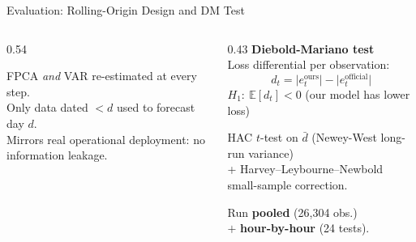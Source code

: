 \documentclass[10pt,aspectratio=169]{beamer}
\begin{document}
\begin{frame}{Evaluation: Rolling-Origin Design and DM Test}
  \begin{columns}
    \begin{column}{0.54\textwidth}
      \begin{center}
      \end{center}
      \small FPCA \emph{and} VAR re-estimated at every step.\\
      Only data dated $< d$ used to forecast day $d$.\\[0.3em]
      Mirrors real operational deployment: no information leakage.
    \end{column}
    \begin{column}{0.43\textwidth}
      \textbf{Diebold-Mariano test}\\[0.3em]
      \small Loss differential per observation:
      \[
        d_t = \lvert e_t^{\text{ours}} \rvert - \lvert e_t^{\text{official}} \rvert
      \]
      $H_1{:}\ \mathbb{E}[d_t] < 0$ (our model has lower loss)

      \vspace{0.3em}
      HAC $t$-test on $\bar{d}$
      {\small (Newey-West long-run variance)}\\
      + Harvey--Leybourne--Newbold small-sample correction.

      \vspace{0.3em}
      Run \textbf{pooled} (26,304 obs.)\\
      \phantom{Run }$+$ \textbf{hour-by-hour} (24 tests).


\end{column}
\end{columns}
\end{frame}
\end{document}
